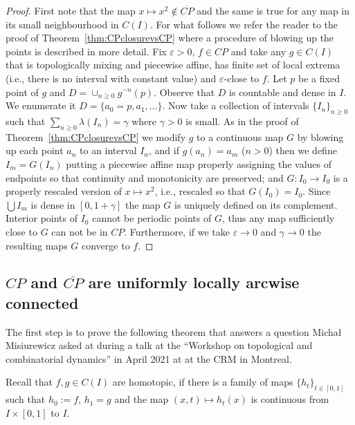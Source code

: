 \documentclass[12pt, a4paper]{amsart}
\def\eps{\varepsilon}
\newcommand{\?}{{\bf ???}}
\def\CP{\overline{CP}}
\begin{document}
\begin{proof}
First note that the map $x\mapsto x^2\notin \CP$ and the same is true for any map in its small neighbourhood in $C(I)$. For what follows we refer the reader to the proof of Theorem~\ref{thm:CPclosurevsCP} where a procedure of blowing up the points is described in more detail. Fix $\eps>0$, $f\in CP$ and take any $g\in C(I)$ that is topologically mixing and piecewise affine, has finite set of local extrema (i.e., there is no interval with constant value) and $\eps$-close to $f$. Let $p$ be a fixed point of $g$ and $D=\cup_{n\geq 0}g^{-n}(p)$. Observe that $D$ is countable and dense in $I$. We enumerate it  $D=\{a_0 = p,a_1,\ldots\}$. Now take a collection of intervals $\{I_n\}_{n\geq 0}$ such that $\sum_{n\geq0}\lambda(I_n)=\gamma$ where $\gamma>0$ is small.
As in the proof of Theorem~\ref{thm:CPclosurevsCP} we modify $g$ to a continuous map $G$ by blowing up each point $a_n$ to an interval $I_n$, and 
if $g(a_n)=a_m$ ($n > 0$) then we define $I_m=G(I_n)$ putting a piecewise affine map properly assigning the values of endpoints so that continuity and monotonicity are preserved; and $G: I_0 \to I_0$ is a  properly rescaled version of   $x \mapsto x^2$, i.e., rescaled so that $G(I_0) = I_0$.
Since $\bigcup I_m$ is dense in $[0,1+\gamma]$
the map $G$ is uniquely defined on
its complement.
Interior points of $I_0$ cannot be periodic points of $G$, thus any map sufficiently close to $G$ can not be in $CP$. Furthermore, if
we take $\eps \to 0$ and $\gamma \to 0$ 
the resulting maps $G$ converge to $f$.
\end{proof}

\subsection{$CP$ and $\overline{CP}$ are uniformly locally arcwise connected}\label{subsec:locallyconnected}

The first step is to prove the following theorem that answers a question  Micha{\l}  Misiurewicz asked at during a talk at the ``Workshop on topological and combinatorial dynamics'' in April 2021 at  
at the CRM in Montreal.

Recall that $f,g\in C(I)$ are homotopic, if there is a family of maps $\{h_t\}_{t\in [0,1]}$ such that $h_0:=f$, $h_1=g$ and the map $(x,t)\mapsto h_t(x)$ is continuous from $I\times[0,1]$ to $I$.
\end{document}
